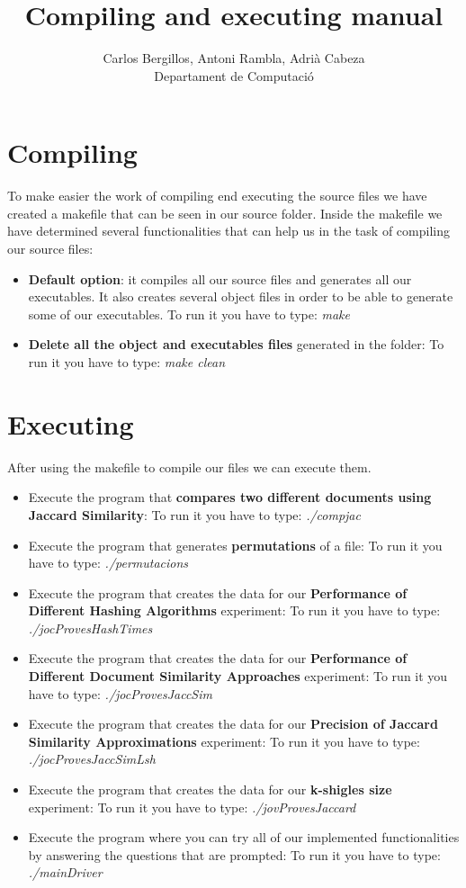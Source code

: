 \documentclass[12pt]{article}
\author{Carlos Bergillos, Antoni Rambla, Adrià Cabeza\\ Departament de Computació}
\title{Compiling and executing manual}
\begin{document}
  \maketitle  
   \newpage
   \section{Compiling}
   To make easier the work of compiling end executing the source files we have created a makefile that can be seen in our source folder. Inside the makefile we have determined several functionalities that can help us in the task of compiling our source files:
   
   \begin{itemize}
   \item \textbf{Default option}: it compiles all our source files and generates all our executables. It also creates several object files in order to be able to generate some of our executables. 
   To run it you have to type: \textit{make}
   \item \textbf{Delete all the object and executables files} generated in the folder:
   To run it you have to type: \textit{make clean}
   \end{itemize}
      \section{Executing}
         After using the makefile to compile our files we can execute them.
            
   \begin{itemize}
           \item Execute the program that \textbf{compares two different documents using Jaccard Similarity}:
   To run it you have to type: \textit{./compjac}
  

   \item Execute the program that generates \textbf{permutations} of a file:
   To run it you have to type: \textit{./permutacions}
    
\item Execute the program that creates the data for our \textbf{Performance of Different Hashing Algorithms} experiment:
   To run it you have to type: \textit{./jocProvesHashTimes}
  
\item Execute the program that creates the data for our \textbf{Performance of Different Document Similarity Approaches} experiment:
   To run it you have to type: \textit{./jocProvesJaccSim}
   \item Execute the program that creates the data for our \textbf{Precision of Jaccard Similarity Approximations} experiment:
   To run it you have to type: \textit{./jocProvesJaccSimLsh}
   
      \item Execute the program that creates the data for our \textbf{k-shigles size} experiment:
   To run it you have to type: \textit{./jovProvesJaccard}

   \item Execute the program where you can try all of our implemented functionalities by answering the questions that are prompted:
   To run it you have to type: \textit{./mainDriver}
      \end{itemize}
\end{document}
